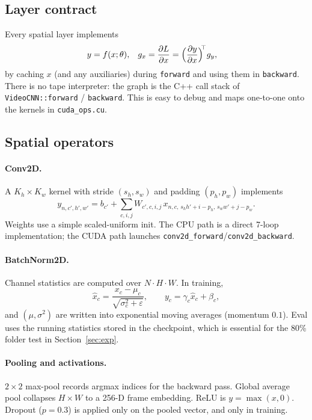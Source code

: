 \documentclass[11pt,a4paper]{article}
\begin{document}
\subsection{Layer contract}

Every spatial layer implements
\begin{align*}
  y &= f(x;\theta), &
  g_x &= \frac{\partial L}{\partial x}
       = \Bigl(\frac{\partial y}{\partial x}\Bigr)^{\!\!\top} g_y,
\end{align*}
by caching $x$ (and any auxiliaries) during \texttt{forward} and using
them in \texttt{backward}.
There is no tape interpreter: the graph is the C++ call stack of
\texttt{VideoCNN::forward} / \texttt{backward}.
This is easy to debug and maps one-to-one onto the kernels in
\texttt{cuda\_ops.cu}.

\subsection{Spatial operators}

\paragraph{Conv2D.}
A $K_h\times K_w$ kernel with stride $(s_h,s_w)$ and padding $(p_h,p_w)$
implements
\[
  y_{n,c',h',w'}
  = b_{c'} + \sum_{c,i,j} W_{c',c,i,j}\,
    x_{n,c,\,s_h h'+i-p_h,\,s_w w'+j-p_w}.
\]
Weights use a simple scaled-uniform init.
The CPU path is a direct 7-loop implementation; the CUDA path launches
\texttt{conv2d\_forward}/\texttt{conv2d\_backward}.

\paragraph{BatchNorm2D.}
Channel statistics are computed over $N\cdot H\cdot W$.
In training,
\[
  \hat x_c = \frac{x_c-\mu_c}{\sqrt{\sigma_c^2+\varepsilon}},\qquad
  y_c = \gamma_c\hat x_c + \beta_c,
\]
and $(\mu,\sigma^2)$ are written into exponential moving averages
(momentum $0.1$).
Eval uses the running statistics stored in the checkpoint, which is
essential for the 80\% folder test in Section~\ref{sec:exp}.

\paragraph{Pooling and activations.}
$2\times 2$ max-pool records argmax indices for the backward pass.
Global average pool collapses $H\times W$ to a 256-D frame embedding.
ReLU is $y=\max(x,0)$.
Dropout ($p=0.3$) is applied only on the pooled vector, and only in
training.
\end{document}
